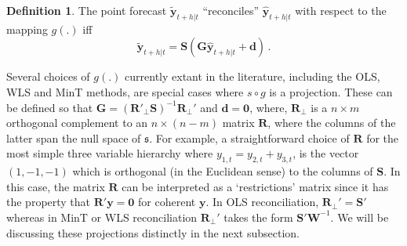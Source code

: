 \documentclass[12pt]{article}
\def\var{\text{Var}}
\theoremstyle{definition}
\newtheorem{definition}{Definition}[section]
\begin{document}
	\begin{definition}\label{def:reconpoint}
		The point forecast $\tilde{\bm{y}}_{t+h|t}$ ``reconciles'' $\hat{\bm{y}}_{t+h|t}$ with respect to the mapping $g(.)$ iff
		\begin{equation}
		\tilde{\bm{y}}_{t+h|t}=\bm{S}(\bm{G}\hat{\bm{y}}_{t+h|t}+\bm{d})\,.
		\end{equation}
	\end{definition}
	
	Several choices of $g(.)$ currently extant in the literature, including the OLS, WLS and MinT methods, are special cases where $s\circ g$ is a projection. These can be defined so that $\bm{G}=({\bm{R}'_{\perp}}\bm{S})^{-1}\bm{R}_{\perp}'$ and $\bm{d}=\bm{0}$, where, ${\bm{R}_{\perp}}$ is a $n\times m$ orthogonal complement to an $n \times (n-m)$ matrix $\bm{R}$, where the columns of the latter span the null space of $\mathfrak{s}$. For example, a straightforward choice of $\bm{R}$ for the most simple three variable hierarchy where $y_{1,t}=y_{2,t}+y_{3,t}$, is the vector $(1,-1,-1)$ which is orthogonal (in the Euclidean sense) to the columns of $\bm{S}$. In this case, the matrix $\bm{R}$ can be interpreted as a `restrictions' matrix since it has the property that $\bm{R}'\bm{y}=\bm{0}$ for coherent $\bm{y}$. In OLS reconciliation, $\bm{R}_{\perp}'= \bm{S}'$ whereas in MinT or WLS reconciliation $\bm{R}_{\perp}'$ takes the form $\bm{S'W}^{-1}$. We will be discussing these projections distinctly in the next subsection. 
	
	
\end{document}
